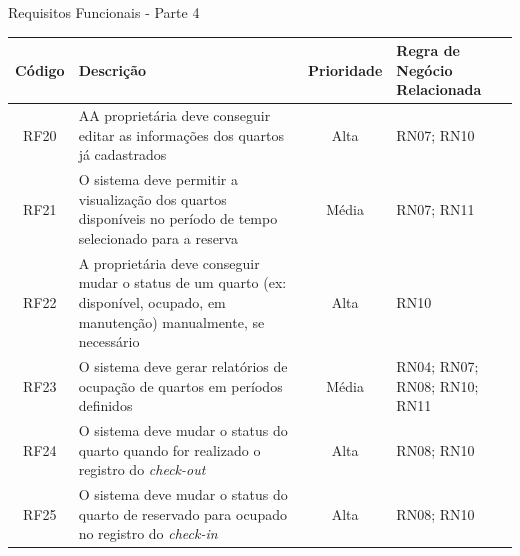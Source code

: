\documentclass[
	12pt,				%
	openany,			%
	twoside,			%
	a4paper,			%
	english,			%
	french,				%
	spanish,			%
	brazil				%
	]{abntex2}
\begin{document}
\begin{quadro}[H]
	\caption{Requisitos Funcionais - Parte 4}
	\label{quadro_rf4}
	\begin{tabular}{|c|p{5cm}|c|p{4cm}|}
		\hline
		\textbf{Código} & \textbf{Descrição} & \textbf{Prioridade} & \textbf{Regra de Negócio Relacionada} \\ \hline
		RF20 & AA proprietária deve conseguir editar as informações dos quartos já cadastrados & Alta & RN07; RN10\\ \hline
		RF21 & O sistema deve permitir a visualização dos quartos disponíveis no período de tempo selecionado para a reserva & Média & RN07; RN11 \\ \hline
		RF22 & A proprietária deve conseguir mudar o status de um quarto (ex: disponível, ocupado, em manutenção) manualmente, se necessário & Alta & RN10 \\ \hline
		RF23 & O sistema deve gerar relatórios de ocupação de quartos em períodos definidos & Média & RN04; RN07; RN08; RN10; RN11 \\ \hline
		RF24 & O sistema deve mudar o status do quarto quando for realizado o registro do \textit{check-out} & Alta & RN08; RN10 \\ \hline
		RF25 & O sistema deve mudar o status do quarto de reservado para ocupado no registro do \textit{check-in} & Alta & RN08; RN10 \\ \hline
	\end{tabular}

\end{quadro}
\end{document}
